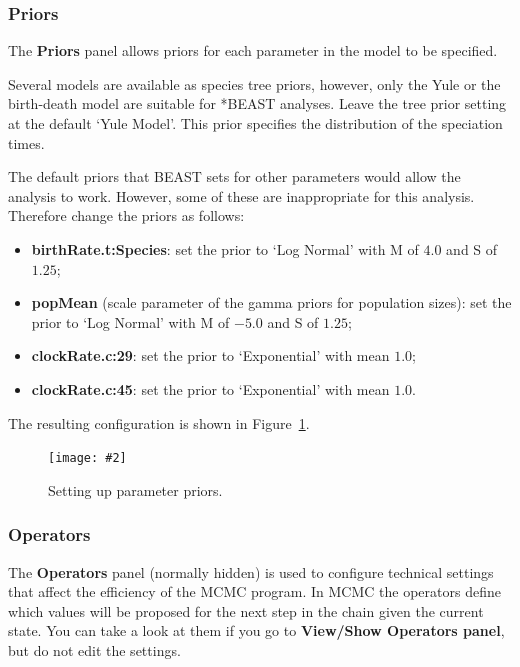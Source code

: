 \documentclass{article}
\newcommand{\includeimage}[2][]{%
\texttt{[image: \#2]}
}
\begin{document}
\subsubsection{Priors}

The {\bf Priors} panel allows priors for each parameter in the model to be specified. 

Several models are available as species tree priors, however, only the Yule or the birth-death model are suitable for *BEAST analyses. Leave the tree prior setting at the default `Yule Model'. This prior specifies the distribution of the speciation times.

The default priors that BEAST sets for other parameters would allow the analysis to work. However, some of these are inappropriate for this analysis. Therefore change the priors as follows:
\begin{itemize}
	\item {\bf birthRate.t:Species}: set the prior to `Log Normal' with M of $4.0$ and S of $1.25$;
	\item {\bf popMean} (scale parameter of the gamma priors for population sizes): set the prior to `Log Normal' with M of $-5.0$ and S of $1.25$; 
	\item {\bf clockRate.c:29}: set the prior to `Exponential' with mean $1.0$;
	\item {\bf clockRate.c:45}: set the prior to `Exponential' with mean $1.0$.
\end{itemize}

The resulting configuration is shown in Figure~\ref{fig.priors}.

\begin{figure}[h]
\centering
\includeimage[scale=0.33,clip=true]{figures/BEAUti_settingPriors}
\caption{\label{fig.priors} Setting up parameter priors.}
\end{figure}

\clearpage

\subsubsection{Operators}

The {\bf Operators} panel (normally hidden) is used to configure technical settings that affect the efficiency of the MCMC program. In MCMC the operators define which values will be proposed for the next step in the chain given the current state. You can take a look at them if you go to {\bf View/Show Operators panel}, but do not edit the settings.
\end{document}
